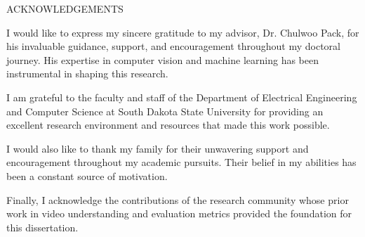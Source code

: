 \documentclass[main.tex]{subfiles}
\begin{document}
\newpage

\begin{center}
ACKNOWLEDGEMENTS
\end{center}

I would like to express my sincere gratitude to my advisor, Dr. Chulwoo Pack, for his invaluable guidance, support, and encouragement throughout my doctoral journey. His expertise in computer vision and machine learning has been instrumental in shaping this research.

I am grateful to the faculty and staff of the Department of Electrical Engineering and Computer Science at South Dakota State University for providing an excellent research environment and resources that made this work possible.

I would also like to thank my family for their unwavering support and encouragement throughout my academic pursuits. Their belief in my abilities has been a constant source of motivation.

Finally, I acknowledge the contributions of the research community whose prior work in video understanding and evaluation metrics provided the foundation for this dissertation.
\end{document}
